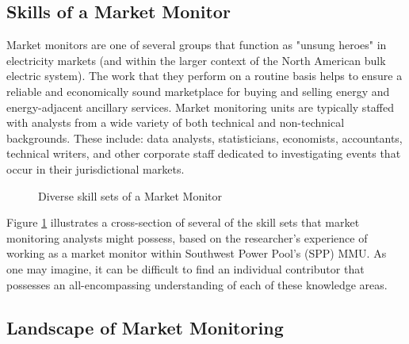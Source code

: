 \subsection{Skills of a Market Monitor}

Market monitors are one of several groups that function as "unsung heroes" in electricity markets (and within the larger context of the North American bulk electric system). The work that they perform on a routine basis helps to ensure a reliable and economically sound marketplace for buying and selling energy and energy-adjacent ancillary services. Market monitoring units are typically staffed with analysts from a wide variety of both technical and non-technical backgrounds. These include: data analysts, statisticians, economists, accountants, technical writers, and other corporate staff dedicated to investigating events that occur in their jurisdictional markets.

\begin{figure}[h]
\centering
{}
\caption{Diverse skill sets of a Market Monitor}
\label{fig:skillset}
\end{figure}

Figure \ref{fig:skillset} illustrates a cross-section of several of the skill sets that market monitoring analysts might possess, based on the researcher's experience of working as a market monitor within Southwest Power Pool's (SPP) MMU. As one may imagine, it can be difficult to find an individual contributor that possesses an all-encompassing understanding of each of these knowledge areas.

\subsection{Landscape of Market Monitoring}

